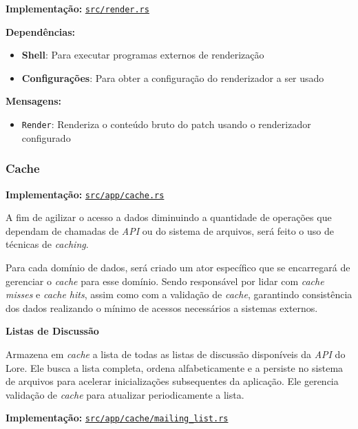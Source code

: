 \textbf{Implementação:} \href{https://github.com/nahharris/ph-actors-tcc/blob/master/src/render.rs}{\texttt{src/render.rs}}

\textbf{Dependências:}

\begin{itemize}
    \item \textbf{Shell}: Para executar programas externos de renderização
    \item \textbf{Configurações}: Para obter a configuração do renderizador a ser usado
\end{itemize}

\textbf{Mensagens:}

\begin{itemize}
    \item \texttt{Render}: Renderiza o conteúdo bruto do patch usando o renderizador configurado
\end{itemize}

\subsubsection{Cache}

\textbf{Implementação:} \href{https://github.com/nahharris/ph-actors-tcc/blob/master/src/app/cache.rs}{\texttt{src/app/cache.rs}}

A fim de agilizar o acesso a dados diminuindo a quantidade de operações que dependam de chamadas de \emph{API} ou do sistema de arquivos, será feito o uso de técnicas de \emph{caching}.

Para cada domínio de dados, será criado um ator específico que se encarregará de gerenciar o \emph{cache} para esse domínio. Sendo responsável por lidar com \emph{cache misses} e \emph{cache hits}, assim como com a validação de \emph{cache}, garantindo consistência dos dados realizando o mínimo de acessos necessários a sistemas externos.

\textbf{Listas de Discussão}

Armazena em \emph{cache} a lista de todas as listas de discussão disponíveis da \emph{API} do Lore. Ele busca a lista completa, ordena alfabeticamente e a persiste no sistema de arquivos para acelerar inicializações subsequentes da aplicação. Ele gerencia validação de \emph{cache} para atualizar periodicamente a lista.

\textbf{Implementação:} \href{https://github.com/nahharris/ph-actors-tcc/blob/master/src/app/cache/mailing_list.rs}{\texttt{src/app/cache/mailing\_list.rs}}

